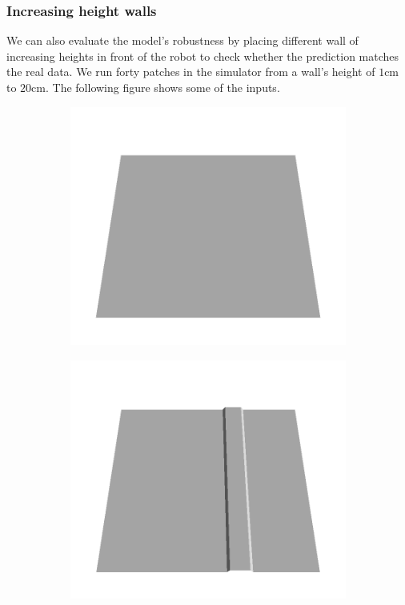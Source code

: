 \subsubsection{Increasing height walls}
We can also evaluate the model's robustness by placing different wall  of increasing heights in front of the robot to check whether the prediction matches the real data. We run forty patches in the simulator from a wall's height of $1$cm to $20$cm. The following figure shows some of the inputs.

\begin{figure}[H]
    \centering
    \begin{subfigure}[b]{0.24\textwidth}
    \includegraphics[width=\linewidth]{../img/5/custom_patches/walls_increasing/all/00-3d.png}
    \end{subfigure}
    \begin{subfigure}[b]{0.24\textwidth}
    \includegraphics[width=\linewidth]{../img/5/custom_patches/walls_increasing/all/03-3d.png}

\end{subfigure}
\end{figure}
